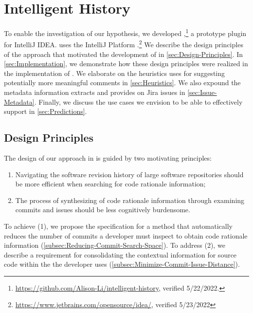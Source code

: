 \chapter{Intelligent History}
\label{ch:Intelligent-History}

To enable the investigation of our hypothesis, we developed ,\footnote{\url{https://github.com/Alison-Li/intelligent-history}, verified 5/22/2022.} a prototype plugin for IntelliJ IDEA.
 uses the IntelliJ Platform .\footnote{\url{https://www.jetbrains.com/opensource/idea/}, verified 5/23/2022}
We describe the design principles of the approach that motivated the development of  in \autoref{sec:Design-Principles}. 
In \autoref{sec:Implementation}, we demonstrate how these design principles were realized in the implementation of . 
We elaborate on the heuristics  uses
for suggesting potentially more meaningful comments in \autoref{sec:Heuristics}.
We also expound the metadata information  extracts and provides on Jira issues in \autoref{sec:Issue-Metadata}. 
Finally, we discuss the use cases we envision  to be able to effectively support in \autoref{sec:Predictions}.

\section{Design Principles}
\label{sec:Design-Principles}

The design of our approach in  is guided by two motivating principles: 

\begin{enumerate}[label={(\arabic*)}]
    \item Navigating the software revision history of large software repositories should be more efficient when searching for code rationale information;
    \item The process of synthesizing of code rationale information through examining commits and issues should be less cognitively burdensome.
\end{enumerate}

To achieve (1), we propose the specification for a method that automatically reduces the number of commits a developer must inspect to obtain code rationale information (\autoref{subsec:Reducing-Commit-Search-Space}).
To address (2), we describe a requirement for consolidating the contextual information for source code within the  the developer uses (\autoref{subsec:Minimize-Commit-Issue-Distance}).

